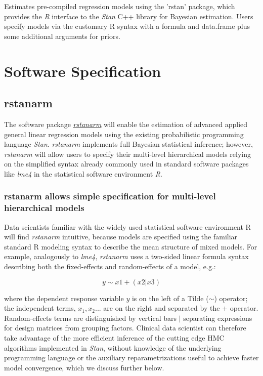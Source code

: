 \documentclass[11pt,notitlepage]{article}
\begin{document}
Estimates pre-compiled regression models using the 'rstan' package, which provides
the \textit{R} interface to the \textit{Stan} C++ library for Bayesian estimation. Users specify models via the customary R syntax with a formula and data.frame plus some additional arguments for priors.

\section*{Software Specification}

\subsection*{rstanarm}
The software package \href{https://github.com/stan-dev/rstanarm}{\textit{rstanarm}}
will enable the estimation of advanced applied general linear regression models using 
the existing probabilistic programming language \textit{Stan}. 
\textit{rstanarm} implements full Bayesian statistical inference;  
however, \textit{rstanarm} will allow users to specify their multi-level 
hierarchical models relying on the simplified syntax already commonly 
used in standard software packages like \textit{lme4} in the statistical 
software environment \textit{R}. 

\subsubsection*{rstanarm allows simple specification for multi-level hierarchical models}

Data scientists familiar with the widely used statistical software environment R will 
find \textit{rstanarm} intuitive, because models are specified using the familiar 
standard R modeling syntax to describe the mean structure of mixed models. 
For example, analogously to \textit{lme4}, \textit{rstanarm} uses a two-sided 
linear formula syntax describing both the fixed-effects and random-effects of 
a model, e.g.:

\begin{figure}
\vspace{-30pt}
\begin{equation}
y \sim x1 +(x2|x3)
\end{equation}
\vspace{-40pt}
\end{figure}

where the dependent response variable $y$ is on the left of a Tilde ($\sim$) operator; 
the independent terms, $x_1, x_2...$ are on the right and separated by the $+$ 
operator. Random-effects terms are distinguished by vertical bars $|$ 
separating expressions for design matrices from grouping factors. Clinical data 
scientist can therefore take advantage of the  more efficient inference of the 
cutting edge HMC algorithms implemented in \textit{Stan}, without knowledge of 
the underlying programming language or the auxiliary reparametrizations useful to 
achieve faster model convergence, which we discuss further below.
\end{document}
